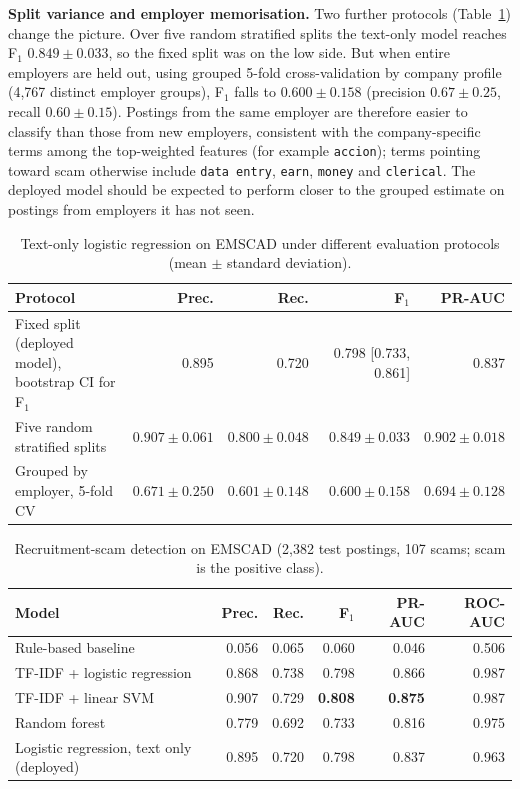 \documentclass[11pt,a4paper]{article}
\begin{document}
\textbf{Split variance and employer memorisation.} Two further protocols (Table~\ref{tab:jobprot}) change the picture. Over five random stratified splits the text-only model reaches F$_1$ $0.849\pm0.033$, so the fixed split was on the low side. But when entire employers are held out, using grouped 5-fold cross-validation by company profile (4{,}767 distinct employer groups), F$_1$ falls to $0.600\pm0.158$ (precision $0.67\pm0.25$, recall $0.60\pm0.15$). Postings from the same employer are therefore easier to classify than those from new employers, consistent with the company-specific terms among the top-weighted features (for example \texttt{accion}); terms pointing toward scam otherwise include \texttt{data entry}, \texttt{earn}, \texttt{money} and \texttt{clerical}. The deployed model should be expected to perform closer to the grouped estimate on postings from employers it has not seen.

\begin{table}[h]
\centering
\caption{Text-only logistic regression on EMSCAD under different evaluation protocols (mean $\pm$ standard deviation).}\label{tab:jobprot}
\small
\begin{tabular}{lrrrr}
\toprule
Protocol & Prec. & Rec. & F$_1$ & PR-AUC \\
\midrule
Fixed split (deployed model), bootstrap CI for F$_1$ & 0.895 & 0.720 & 0.798 [0.733, 0.861] & 0.837 \\
Five random stratified splits & $0.907\pm0.061$ & $0.800\pm0.048$ & $0.849\pm0.033$ & $0.902\pm0.018$ \\
Grouped by employer, 5-fold CV & $0.671\pm0.250$ & $0.601\pm0.148$ & $0.600\pm0.158$ & $0.694\pm0.128$ \\
\bottomrule
\end{tabular}
\end{table}

\begin{table}[h]
\centering
\caption{Recruitment-scam detection on EMSCAD (2{,}382 test postings, 107 scams; scam is the positive class).}\label{tab:job}
\begin{tabular}{lrrrrr}
\toprule
Model & Prec. & Rec. & F$_1$ & PR-AUC & ROC-AUC \\
\midrule
Rule-based baseline & 0.056 & 0.065 & 0.060 & 0.046 & 0.506 \\
TF-IDF + logistic regression & 0.868 & 0.738 & 0.798 & 0.866 & 0.987 \\
TF-IDF + linear SVM & 0.907 & 0.729 & \textbf{0.808} & \textbf{0.875} & 0.987 \\
Random forest & 0.779 & 0.692 & 0.733 & 0.816 & 0.975 \\
Logistic regression, text only (deployed) & 0.895 & 0.720 & 0.798 & 0.837 & 0.963 \\
\bottomrule
\end{tabular}
\end{table}
\end{document}
